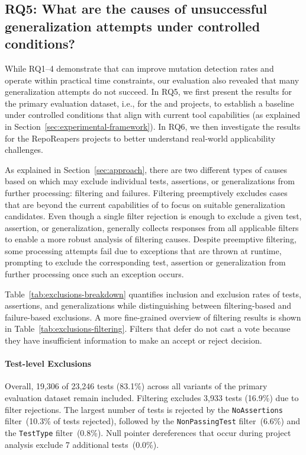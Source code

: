 \subsection{RQ5: What are the causes of unsuccessful generalization attempts under controlled conditions?}
\label{sec:limitations-eval}

While RQ1--4 demonstrate that \ToolTeralizer{} can improve mutation detection rates
and operate within practical time constraints,
our evaluation also revealed that many generalization attempts do not succeed.
In RQ5, we first present the results for the primary
evaluation dataset, i.e., for the \DatasetsEqBenchEs{} and \DatasetsCommons{} projects,
to establish a baseline under controlled conditions
that align with current tool capabilities
(as explained in Section~\ref{sec:experimental-framework}).
In RQ6, we then investigate the results for the RepoReapers projects
to better understand real-world applicability challenges.

As explained in Section~\ref{sec:approach},
there are two different types of causes
based on which \ToolTeralizer{} may exclude individual tests, assertions, or generalizations
from further processing:
filtering and failures.
Filtering preemptively excludes cases that are beyond the current capabilities of \ToolTeralizer{}
to focus on suitable generalization candidates.
Even though a single filter rejection is enough
to exclude a given test, assertion, or generalization,
\ToolTeralizer{} generally collects responses from all
applicable filters to enable a more robust analysis of filtering causes.
Despite preemptive filtering,
some processing attempts fail due to exceptions that are thrown at runtime,
prompting \ToolTeralizer{} to exclude the corresponding
test, assertion or generalization from further processing once such an exception occurs.

Table~\ref{tab:exclusions-breakdown}
quantifies inclusion and exclusion rates
of tests, assertions, and generalizations
while distinguishing between
filtering-based and failure-based exclusions.
A more fine-grained overview of filtering results
is shown in Table~\ref{tab:exclusions-filtering}.
Filters that defer do not cast a vote
because they have insufficient information to make an accept or reject decision.

\paragraph{Test-level Exclusions}

Overall, 19,306 of 23,246 \VariantOriginal{} tests (83.1\%)
across all variants of the primary evaluation dataset remain included.
Filtering excludes 3,933 tests (16.9\%) due to filter rejections.
The largest number of tests is rejected by the \texttt{NoAssertions} filter~(10.3\% of tests rejected),
followed by the \texttt{NonPassingTest} filter~(6.6\%)
and the \texttt{TestType} filter~(0.8\%).
Null pointer dereferences that occur during project analysis
exclude 7 additional tests~(0.0\%).

